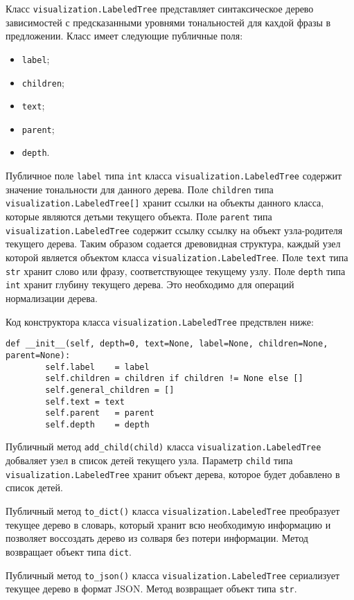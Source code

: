 Класс \texttt{visualization.LabeledTree} представляет синтаксическое дерево зависимостей с предсказанными уровнями тональностей для кахдой фразы в предложении. Класс имеет следующие публичные поля:
\begin{itemize}
\item \texttt{label};
\item \texttt{children};
\item \texttt{text};
\item \texttt{parent};
\item \texttt{depth}.
\end{itemize}

Публичное поле \texttt{label} типа \texttt{int} класса \texttt{visualization.LabeledTree} содержит значение тональности для данного дерева. Поле \texttt{children} типа \texttt{visualization.LabeledTree[]} хранит ссылки на объекты данного класса, которые являются детьми текущего объекта. Поле \texttt{parent} типа \texttt{visualization.LabeledTree} содержит ссылку ссылку на объект узла-родителя текущего дерева. Таким образом содается древовидная структура, каждый узел которой является объектом класса \texttt{visualization.LabeledTree}. Поле \texttt{text} типа \texttt{str} хранит слово или фразу, соответствующее текущему узлу. Поле \texttt{depth} типа \texttt{int} хранит глубину текущего дерева. Это необходимо для операций нормализации дерева.

Код конструктора класса \texttt{visualization.LabeledTree} предствлен ниже:
\medskip
\begin{lstlisting}[style=Python]
    def __init__(self, depth=0, text=None, label=None, children=None, parent=None):
        self.label    = label
        self.children = children if children != None else []
        self.general_children = []
        self.text = text
        self.parent   = parent
        self.depth    = depth
\end{lstlisting}
\medskip

Публичный метод \texttt{add\_child(child)} класса \texttt{visualization.LabeledTree} добваляет узел в список детей текущего узла. Параметр \texttt{child} типа \texttt{visualization.LabeledTree} хранит объект дерева, которое будет добавлено в список детей.

Публичный метод \texttt{to\_dict()} класса \texttt{visualization.LabeledTree} преобразует текущее дерево в словарь, который хранит всю необходимую информацию и позволяет воссоздать дерево из солваря без потери информации. Метод возвращает объект типа \texttt{dict}.

Публичный метод \texttt{to\_json()} класса \texttt{visualization.LabeledTree} сериализует текущее дерево в формат JSON. Метод возвращает объект типа \texttt{str}.